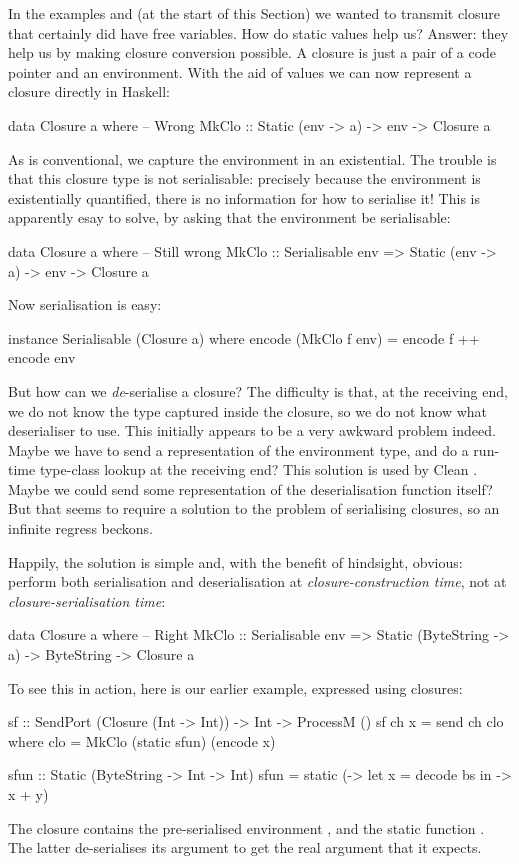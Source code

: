 \documentclass[preprint]{sigplanconf}
\begin{document}
In the examples  and
 (at the start of this Section) we wanted to transmit closure
that certainly did have free variables.  How do static values help us?
Answer: they help us by making closure conversion possible. A closure
is just a pair of a code pointer and an environment.  With the aid of
 values we can now represent a closure directly in Haskell:
\begin{code}
data Closure a where   -- Wrong
  MkClo :: Static (env -> a) 
        -> env -> Closure a
\end{code}
As is conventional, we capture the environment in an existential.
The trouble is that this closure type is not serialisable: precisely
because the environment is existentially quantified, there is no information
for how to serialise it!  This is apparently esay to solve, by asking
that the environment be serialisable:
\begin{code}
data Closure a where   -- Still wrong
  MkClo :: Serialisable env
        => Static (env -> a) -> env -> Closure a
\end{code}
Now serialisation is easy:
\begin{code}
instance Serialisable (Closure a) where
   encode (MkClo f env) = encode f ++ encode env
\end{code}
But how can we \emph{de}-serialise a closure?  The difficulty is
that, at the receiving end, we do not know the type captured inside
the closure, so we do not know what deserialiser to use.  This initially
appears to be a very awkward problem indeed. Maybe we have to send a 
representation of the environment type, and do a run-time type-class lookup
at the receiving end?  This solution is used by Clean \cite{clean}.  Maybe
we could send some representation of the deserialisation function itself?
But that seems to require a solution to the problem of serialising 
closures, so an infinite regress beckons.

Happily, the solution is simple and, with the benefit of hindsight,
obvious: perform both serialisation and deserialisation at \emph{closure-construction time},
not at \emph{closure-serialisation time}:
\begin{code}
data Closure a where   -- Right
  MkClo :: Serialisable env
        => Static (ByteString -> a) 
        -> ByteString -> Closure a
\end{code}
To see this in action, here is our earlier  example, 
expressed using closures:
\begin{code}
  sf :: SendPort (Closure (Int -> Int)) 
     -> Int -> ProcessM ()
  sf ch x = send ch clo
    where
      clo  = MkClo (static sfun) (encode x)

  sfun :: Static (ByteString -> Int -> Int)
  sfun = static (\bs -> let x = decode bs 
                        in \y -> x + y)
\end{code}
The closure contains the pre-serialised environment ,
and the static function . The latter de-serialises its
argument  to get the real argument  that it expects.
\end{document}
